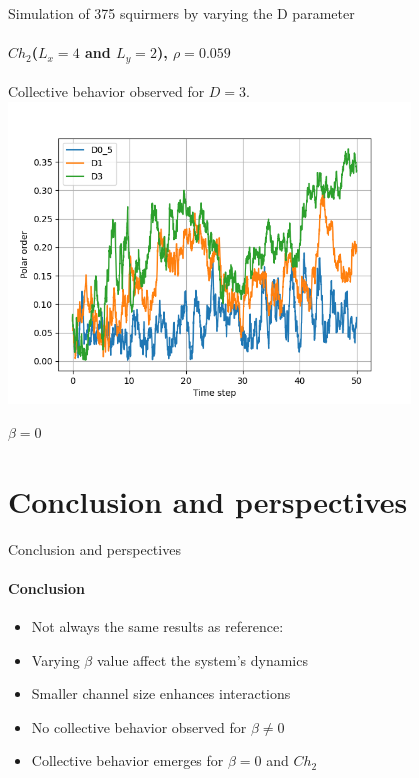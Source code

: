 \documentclass{beamer}
\begin{document}
\begin{frame}{Simulation of 375 squirmers by varying the D parameter}
    \framesubtitle{$Ch_2$($L_x = 4$ and $L_y = 2$), $\rho = 0.059$}
    \begin{center}
        Collective behavior observed for $D = 3$.
        \includegraphics[width=0.8\textwidth]{../../videos/simulations/sim_D/beta0/dens_0_59/combined_polars.png}    
    \end{center}
    \begin{center}
        \footnotesize $\beta = 0$
    \end{center}
\end{frame}

\section{Conclusion and perspectives}
\begin{frame}{Conclusion and perspectives}
    \framesubtitle{Conclusion}
    \begin{center}
        \begin{itemize}
            \item Not always the same results as reference:\cite{Stark}
            \item Varying $\beta$ value affect the system's dynamics
            \item Smaller channel size enhances interactions
            \item No collective behavior observed for $\beta \neq 0$
            \item Collective behavior emerges for $\beta = 0$ and $Ch_2$
        \end{itemize}
    \end{center}
\end{frame}
\end{document}
